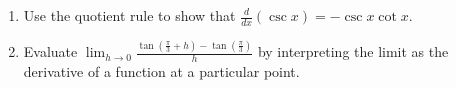 \documentclass[12pt]{article}
\newif\ifans
\begin{document}
\begin{enumerate}
\ifans{\fbox{\parbox{0.5\linewidth}{
\begin{align*}
\frac{d}{dx}(\cot{x})&=\frac{d}{dx}\left(\frac{\cos{x}}{\sin{x}}\right)\\
&=\frac{(\sin{x})(-\sin{x})-(\cos{x})(\cos{x})}{\sin^2{x}}\\
&=\frac{-(\sin^2{x}+\cos^2{x})}{\sin^2{x}}\\
&=-\frac{1}{\sin^2{x}}\\
&=-\csc^2{x}
\end{align*}
}}} \fi

\item Use the quotient rule to show that $\frac{d}{dx}(\csc{x})=-\csc{x}\cot{x}$.

\ifans{\fbox{\parbox{0.5\linewidth}{
\begin{align*}
\frac{d}{dx}(\csc{x})&=\frac{d}{dx}\left(\frac{1}{\sin{x}}\right)\\
&=\frac{(\sin{x})(0)-(1)(\cos{x})}{\sin^2{x}}\\
&=-\frac{\cos{x}}{\sin^2{x}}\\
&=-\frac{1}{\sin{x}}\frac{\cos{x}}{\sin{x}}\\
&=-\csc{x}\cot{x}
\end{align*}
}}} \fi

\item Evaluate $\lim_{h \rightarrow 0}{\frac{\tan{\left(\frac{\pi}{3}+h\right)}-\tan{\left(\frac{\pi}{3}\right)}}{h}}$ by interpreting the limit as the derivative of a function at a particular point.

\ifans{\fbox{$\lim_{h \rightarrow 0}{\frac{\tan{\left(\frac{\pi}{3}+h\right)}-\tan{\left(\frac{\pi}{3}\right)}}{h}}=\left.\frac{d}{dx}(\tan{x})\right|_{x=\frac{\pi}{3}}=\sec^2{\left(\frac{\pi}{3}\right)}=4$}} \fi

\end{enumerate}

\end{document}

